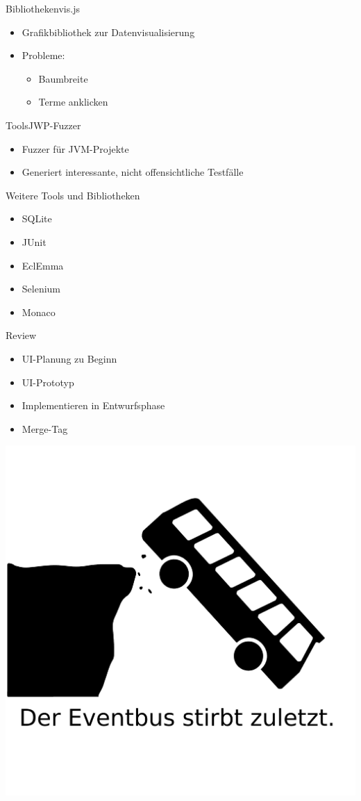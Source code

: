 \documentclass[10pt]{beamer}
\begin{document}
\begin{frame}{Bibliotheken}{vis.js}
	\begin{itemize}
		\item Grafikbibliothek zur Datenvisualisierung
		\item Probleme: 
			\begin{itemize}
				\item{Baumbreite}
				\item{Terme anklicken}
			\end{itemize}
	\end{itemize}
\end{frame}

\begin{frame}{Tools}{JWP-Fuzzer}
	\begin{itemize}
		\item Fuzzer für JVM-Projekte
		\item Generiert interessante, nicht offensichtliche Testfälle
	\end{itemize}
\end{frame}


\begin{frame}{Weitere Tools und Bibliotheken}{}
	\begin{itemize}
		\item SQLite
		\item JUnit
		\item EclEmma
		\item Selenium
		\item Monaco
	\end{itemize}
\end{frame}


\begin{frame}{Review}{}
	\begin{itemize}
		\item UI-Planung zu Beginn
		\item UI-Prototyp
		\item Implementieren in Entwurfsphase
		\item Merge-Tag
	\end{itemize}
\end{frame}

{\1
\begin{frame}
  \includegraphics[width = \textwidth]{img/eventbus}
\end{frame}}
\end{document}
